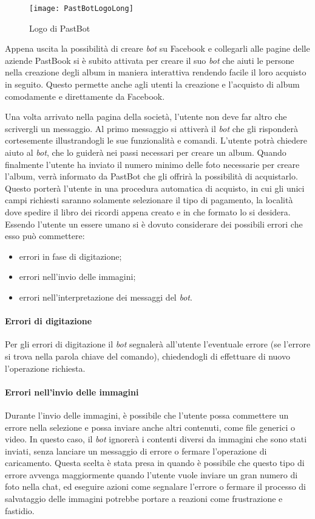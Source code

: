 \begin{figure}[H]
  \centering
  \texttt{[image: PastBotLogoLong]}
  \caption{Logo di PastBot}
\end{figure}
Appena uscita la possibilità di creare \textit{bot} su Facebook e collegarli
alle pagine delle aziende PastBook si è subito attivata per creare il suo
\textit{bot} che aiuti le persone nella creazione degli album in maniera
interattiva rendendo facile il loro acquisto in seguito. Questo permette anche
agli utenti la creazione e l'acquisto di album comodamente e direttamente da
Facebook.

Una volta arrivato nella pagina della società, l'utente non deve far altro che
scrivergli un messaggio. Al primo messaggio si attiverà il \textit{bot} che
gli risponderà cortesemente illustrandogli le sue funzionalità e comandi.
L'utente potrà chiedere aiuto al \textit{bot}, che lo guiderà nei passi
necessari per creare un album. Quando finalmente l'utente ha inviato il numero
minimo delle foto necessarie per creare l'album, verrà informato da PastBot che
gli offrirà la possibilità di acquistarlo. Questo porterà l'utente in una
procedura automatica di acquisto, in cui gli unici campi richiesti saranno
solamente selezionare il tipo di pagamento, la località dove spedire il libro
dei ricordi appena creato e in che formato lo si desidera. \\

Essendo l'utente un essere umano si è dovuto considerare dei possibili errori
che esso può commettere:
\begin{itemize}
  \item errori in fase di digitazione;
  \item errori nell'invio delle immagini;
  \item errori nell'interpretazione dei messaggi del \textit{bot}.
\end{itemize}

\paragraph*{Errori di digitazione} Per gli errori di digitazione il \textit{bot}
segnalerà all'utente l'eventuale errore (se l'errore si trova nella parola
chiave del comando), chiedendogli di effettuare di nuovo l'operazione richiesta.

\paragraph*{Errori nell'invio delle immagini} Durante l'invio delle immagini, è
possibile che l'utente possa commettere un errore nella selezione e possa
inviare anche altri contenuti, come file generici o video. In questo caso, il
\textit{bot} ignorerà i contenti diversi da immagini che sono stati inviati,
senza lanciare un messaggio di errore o fermare l'operazione di caricamento.
Questa scelta è stata presa in quando è possibile che questo tipo di errore
avvenga maggiormente quando l'utente vuole inviare un gran numero di foto nella
chat, ed eseguire azioni come segnalare l'errore o fermare il processo di
salvataggio delle immagini potrebbe portare a reazioni come frustrazione e
fastidio.

